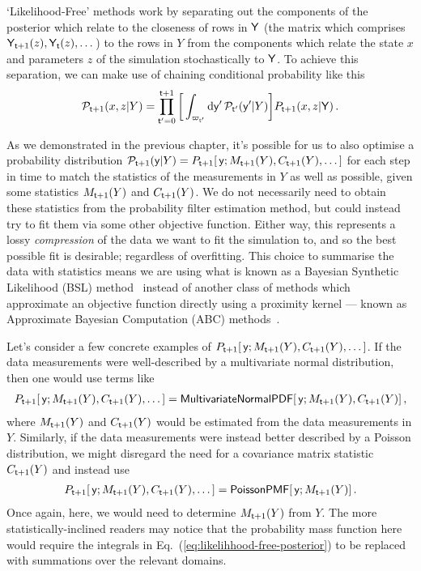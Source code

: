 `Likelihood-Free' methods work by separating out the components of the posterior which relate to the closeness of rows in ${\sf Y}$ (the matrix which comprises ${\sf Y}_{{\sf t}+1}(z), {\sf Y}_{{\sf t}}(z), \dots$) to the rows in $Y$ from the components which relate the state $x$ and parameters $z$ of the simulation stochastically to ${\sf Y}$. To achieve this separation, we can make use of chaining conditional probability like this
\begin{align}
{\cal P}_{{\sf t}+1}(x,z\vert Y)=\prod_{{\sf t}'=0}^{{\sf t}+1} \bigg[ \int_{\varpi_{{\sf t}'}} {\rm d}{\sf y}' \, {\cal P}_{{\sf t}'}({\sf y}'\vert Y) \bigg] P_{{\sf t}+1}(x,z \vert {\sf Y}) \label{eq:likelihhood-free-posterior} \,.
\end{align}

As we demonstrated in the previous chapter, it's possible for us to also optimise a probability distribution ${\cal P}_{{\sf t}+1}({\sf y}\vert Y) = P_{{\sf t}+1}[\,{\sf y};M_{{\sf t}+1}(Y),C_{{\sf t}+1}(Y), \dots ]$ for each step in time to match the statistics of the measurements in $Y$ as well as possible, given some statistics $M_{{\sf t}+1}(Y)$ and $C_{{\sf t}+1}(Y)$. We do not necessarily need to obtain these statistics from the probability filter estimation method, but could instead try to fit them via some other objective function. Either way, this represents a lossy \emph{compression} of the data we want to fit the simulation to, and so the best possible fit is desirable; regardless of overfitting. This choice to summarise the data with statistics means we are using what is known as a Bayesian Synthetic Likelihood (BSL) method~\cite{price2018bayesian,wood2010statistical} instead of another class of methods which approximate an objective function directly using a proximity kernel --- known as Approximate Bayesian Computation (ABC) methods~\cite{sisson2018handbook}.

Let's consider a few concrete examples of $P_{{\sf t}+1}[\,{\sf y};M_{{\sf t}+1}(Y),C_{{\sf t}+1}(Y), \dots ]$. If the data measurements were well-described by a multivariate normal distribution, then one would use terms like
\begin{align}
P_{{\sf t}+1}[\,{\sf y};M_{{\sf t}+1}(Y),C_{{\sf t}+1}(Y), \dots ] = {\sf MultivariateNormalPDF}[\,{\sf y};M_{{\sf t}+1}(Y),C_{{\sf t}+1}(Y)]\,,
\end{align}
where $M_{{\sf t}+1}(Y)$ and $C_{{\sf t}+1}(Y)$ would be estimated from the data measurements in $Y$. Similarly, if the data measurements were instead better described by a Poisson distribution, we might disregard the need for a covariance matrix statistic $C_{{\sf t}+1}(Y)$ and instead use
\begin{align}
P_{{\sf t}+1}[\,{\sf y};M_{{\sf t}+1}(Y),C_{{\sf t}+1}(Y), \dots ] = {\sf PoissonPMF}[\,{\sf y};M_{{\sf t}+1}(Y)]\,.
\end{align}
Once again, here, we would need to determine $M_{{\sf t}+1}(Y)$ from $Y$. The more statistically-inclined readers may notice that the probability mass function here would require the integrals in Eq.~(\ref{eq:likelihhood-free-posterior}) to be replaced with summations over the relevant domains.

